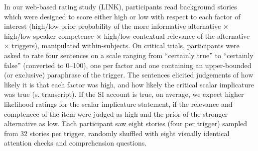 \documentclass[11pt,letterpaper]{article}
\begin{document}
In our web-based rating study (LINK), participants read background stories which were designed to score either high or low with respect to each factor of interest (high/low prior probability of the more informative alternative $\times$ high/low speaker competence $\times$ high/low contextual relevance of the alternative $\times$ triggers), manipulated within-subjects. 
On critical trials, participants were asked to rate four sentences on a scale ranging from ``certainly true'' to ``certainly false'' (converted to 0--100), one per factor and one containing an upper-bounded (or exclusive) paraphrase of the trigger. The sentences elicited judgements of how likely it is that each factor was high, and how likely the critical scalar implicature was true (s. transcript). If the SI account is true, on average, we expect higher likelihood ratings for the scalar implicature statement, if the relevance and comptenece of the item were judged as high and the prior of the stronger alternative as low. Each participant saw eight stories (four per trigger) sampled from 32 stories per trigger, randomly shuffled with eight visually identical attention checks and comprehension questions.
\end{document}
